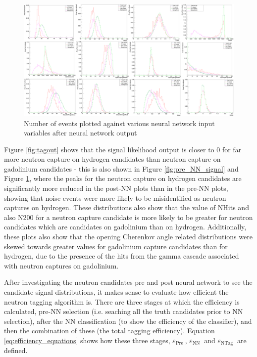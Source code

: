 \begin{landscape}
    \begin{figure}[t]
        \centering
        \hbox{\hspace{-0.5em}\includegraphics[width=\pdfpagewidth]{Figures/postNNvariablesbkg.PNG}}
        \caption{Number of events plotted against various neural network input variables after neural network output}
        \label{fig:post_NN_signal}
    \end{figure}
\end{landscape}



Figure \ref{fig:tagout} shows that the signal likelihood output is closer to 0 for far more neutron capture on hydrogen candidates than neutron capture on gadolinium candidates - this is also shown in Figure \ref{fig:pre_NN_signal} and Figure \ref{fig:post_NN_signal}, where the peaks for the neutron capture on hydrogen candidates are significantly more reduced in the post-NN plots than in the pre-NN plots, showing that noise events were more likely to be misidentified as neutron captures on hydrogen. These distributions also show that the value of NHits and also N200 for a neutron capture candidate is more likely to be greater for neutron candidates which are candidates on gadolinium than on hydrogen. Additionally, these plots also show that the opening Cherenkov angle related distributions were skewed towards greater values for gadolinium capture candidates than for hydrogen, due to the presence of the hits from the gamma cascade associated with neutron captures on gadolinium. 

After investigating the neutron candidates pre and post neural network to see the candidate signal distributions, it makes sense to evaluate how efficient the neutron tagging algorithm is. There are three stages at which the efficiency is calculated, pre-NN selection (i.e. seaching all the truth candidates prior to NN selection), after the NN classification (to show the efficiency of the classifier), and then the combination of these (the total tagging efficiency). Equation \ref{eq:efficiency_equations} shows how these three stages, $\varepsilon_{\text {Pre }}$, $\varepsilon_{\text {NN }}$ and $\varepsilon_{\text {NTag }}$ are defined.

